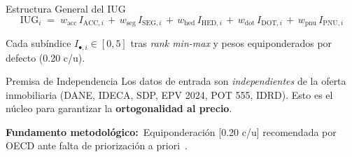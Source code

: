 \documentclass[aspectratio=169,11pt]{beamer}
\newcommand{\hi}[1]{\textcolor{inmuGreen}{\textbf{#1}}}
\newcommand{\framenote}[1]{%
  \vfill
  {\scriptsize\color{inmuMuted}\textbf{Fundamento metodológico:}\ #1}%
}
\begin{document}
\begin{frame}{Estructura General del IUG}
  \[
    \mathrm{IUG}_i \;=\; w_{\text{acc}} \, I_{\text{ACC},i}
                  \,+\, w_{\text{seg}} \, I_{\text{SEG},i}
                  \,+\, w_{\text{hed}} \, I_{\text{HED},i}
                  \,+\, w_{\text{dot}} \, I_{\text{DOT},i}
                  \,+\, w_{\text{pnu}} \, I_{\text{PNU},i}
  \]
  \begin{center}
    \footnotesize Cada subíndice $I_{\bullet,i} \in [0, 5]$ tras
    \textit{rank min-max} y pesos equiponderados por defecto (0.20 c/u).
  \end{center}
  \vspace{0.4em}
  \begin{block}{Premisa de Independencia}
    Los datos de entrada son \emph{independientes} de la oferta inmobiliaria (DANE, IDECA, SDP, EPV 2024, POT 555, IDRD). Esto es el núcleo para garantizar la \hi{ortogonalidad al precio}.
  \end{block}
  \framenote{Equiponderación [0.20 c/u] recomendada por OECD ante falta de priorización a priori~\cite{nardo2008}.}
\end{frame}
\end{document}
